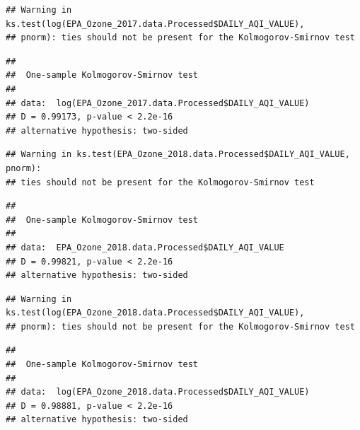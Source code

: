 \documentclass[12pt,]{article}
\newenvironment{Shaded}{\begin{snugshade}}{\end{snugshade}}
\newcommand{\KeywordTok}[1]{\textcolor[rgb]{0.13,0.29,0.53}{\textbf{#1}}}
\newcommand{\FloatTok}[1]{\textcolor[rgb]{0.00,0.00,0.81}{#1}}
\newcommand{\OperatorTok}[1]{\textcolor[rgb]{0.81,0.36,0.00}{\textbf{#1}}}
\newcommand{\NormalTok}[1]{#1}
\begin{document}
\begin{verbatim}
## Warning in ks.test(log(EPA_Ozone_2017.data.Processed$DAILY_AQI_VALUE),
## pnorm): ties should not be present for the Kolmogorov-Smirnov test
\end{verbatim}

\begin{verbatim}
## 
##  One-sample Kolmogorov-Smirnov test
## 
## data:  log(EPA_Ozone_2017.data.Processed$DAILY_AQI_VALUE)
## D = 0.99173, p-value < 2.2e-16
## alternative hypothesis: two-sided
\end{verbatim}

\begin{Shaded}
\end{Shaded}

\begin{verbatim}
## Warning in ks.test(EPA_Ozone_2018.data.Processed$DAILY_AQI_VALUE, pnorm):
## ties should not be present for the Kolmogorov-Smirnov test
\end{verbatim}

\begin{verbatim}
## 
##  One-sample Kolmogorov-Smirnov test
## 
## data:  EPA_Ozone_2018.data.Processed$DAILY_AQI_VALUE
## D = 0.99821, p-value < 2.2e-16
## alternative hypothesis: two-sided
\end{verbatim}

\begin{Shaded}
\end{Shaded}

\begin{verbatim}
## Warning in ks.test(log(EPA_Ozone_2018.data.Processed$DAILY_AQI_VALUE),
## pnorm): ties should not be present for the Kolmogorov-Smirnov test
\end{verbatim}

\begin{verbatim}
## 
##  One-sample Kolmogorov-Smirnov test
## 
## data:  log(EPA_Ozone_2018.data.Processed$DAILY_AQI_VALUE)
## D = 0.98881, p-value < 2.2e-16
## alternative hypothesis: two-sided
\end{verbatim}
\end{document}
